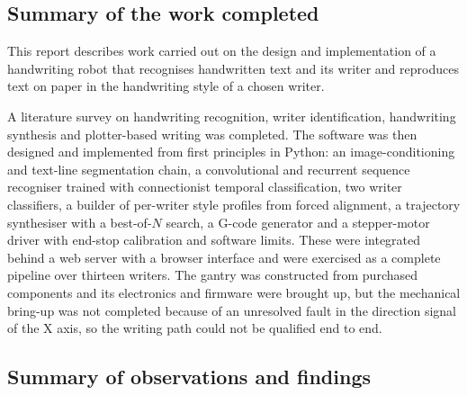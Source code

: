 \subsection{Summary of the work completed}
\label{sec:con-work}

This report describes work carried out on the design and implementation of a handwriting robot that recognises handwritten text and its writer and reproduces text on paper in the handwriting style of a chosen writer.

A literature survey on handwriting recognition, writer identification, handwriting synthesis and plotter-based writing was completed.
The software was then designed and implemented from first principles in Python: an image-conditioning and text-line segmentation chain, a convolutional and recurrent sequence recogniser trained with connectionist temporal classification, two writer classifiers, a builder of per-writer style profiles from forced alignment, a trajectory synthesiser with a best-of-$N$ search, a G-code generator and a stepper-motor driver with end-stop calibration and software limits.
These were integrated behind a web server with a browser interface and were exercised as a complete pipeline over thirteen writers.
The gantry was constructed from purchased components and its electronics and firmware were brought up, but the mechanical bring-up was not completed because of an unresolved fault in the direction signal of the X axis, so the writing path could not be qualified end to end.

\subsection{Summary of observations and findings}
\label{sec:con-findings}

